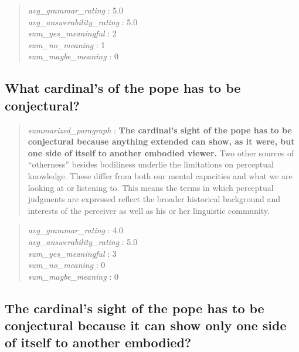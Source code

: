 \begin{quote}
\emph{avg\_grammar\_rating} : 5.0\\
\emph{avg\_answerability\_rating} : 5.0\\
\emph{sum\_yes\_meaningful} : 2\\
\emph{sum\_no\_meaning} : 1\\
\emph{sum\_maybe\_meaning} : 0
\end{quote}

\hypertarget{what-cardinals-of-the-pope-has-to-be-conjectural}{%
\subsection{What cardinal's of the pope has to be
conjectural?}\label{what-cardinals-of-the-pope-has-to-be-conjectural}}

\begin{quote}
\emph{summarized\_paragraph} : \textbf{The cardinal's sight of the pope
has to be conjectural because anything extended can show, as it were,
but one side of itself to another embodied viewer.} Two other sources of
``otherness'' besides bodiliness underlie the limitations on perceptual
knowledge. These differ from both our mental capacities and what we are
looking at or listening to. This means the terms in which perceptual
judgments are expressed reflect the broader historical background and
interests of the perceiver as well as his or her linguistic community.
\end{quote}

\begin{quote}
\emph{avg\_grammar\_rating} : 4.0\\
\emph{avg\_answerability\_rating} : 5.0\\
\emph{sum\_yes\_meaningful} : 3\\
\emph{sum\_no\_meaning} : 0\\
\emph{sum\_maybe\_meaning} : 0
\end{quote}

\hypertarget{the-cardinals-sight-of-the-pope-has-to-be-conjectural-because-it-can-show-only-one-side-of-itself-to-another-embodied}{%
\subsection{The cardinal's sight of the pope has to be conjectural
because it can show only one side of itself to another
embodied?}\label{the-cardinals-sight-of-the-pope-has-to-be-conjectural-because-it-can-show-only-one-side-of-itself-to-another-embodied}}

